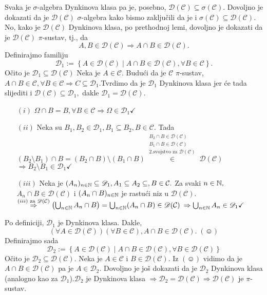 \documentclass{article}
\begin{document}
Svaka je \(\sigma\)-algebra Dynkinova klasa pa je, posebno, \(\mathscr D(\mathcal C)\subseteq\sigma(\mathcal C).\) Dovoljno je dokazati da je \(\mathscr D(\mathcal C)\) \(\sigma\)-algebra kako bismo zaključili da je i \(\sigma(\mathcal C)\subseteq\mathscr D(\mathcal C).\) No, kako je \(\mathscr D(\mathcal C)\) Dynkinova klasa, po prethodnoj lemi, dovoljno je dokazati da je \(\mathscr D(\mathcal C)\) \(\pi\)-sustav, tj., da \[A,B\in\mathscr D(\mathcal C)\Rightarrow A\cap B\in\mathscr D(\mathcal C).\] Definirajmo familiju \[\mathscr D_1:=\left\{A\in\mathscr D(\mathcal C)\mid A\cap B\in\mathscr D(\mathcal C),\forall B\in\mathcal C\right\}.\] Očito je \(\mathscr D_1\subseteq\mathscr D(\mathcal C)\) Neka je \(A\in\mathcal C.\) Budući da je \(\mathcal C\) \(\pi\)-sustav, \(A\cap B\in\mathcal C,\forall B\in\mathcal C\Rightarrow C\subseteq\mathscr D_1.\)\newline Tvrdimo da je \(\mathscr D_1\) Dynkinova klasa jer će tada slijediti i \(\mathscr D(\mathcal C)\subseteq\mathscr D_1,\) dakle \(\mathscr D_1=\mathscr D(\mathcal C).\) 
\begin{enumerate}
    \item[\((i)\)] \(\Omega\cap B=B,\forall B\in\mathcal C\Rightarrow\Omega\in\mathscr D_1\checkmark\)
    \item[\((ii)\)] Neka su \(B_1,B_2\in\mathscr D_1, B_1\subseteq B_2, B\in\mathcal C.\) Tada \((B_2\setminus B_1)\cap B=(B_2\cap B)\setminus(B_1\cap B)\overset{\substack{B_2\cap B\in\mathscr D(\mathcal C)\\ B_1\cap B\in\mathscr D(\mathcal C)\\2.\text{svojstvo za }\mathscr D(\mathcal C)}}{\in}\mathscr D(\mathcal C)\)\newline \(\Rightarrow B_2\setminus B_1\in\mathscr D_1\checkmark\) 
    \item[\((iii)\)] Neka je \((A_n)_{n\in\Bbb N}\subseteq\mathscr D_1, A_1\subseteq A_2\subseteq, B\in\mathcal C.\) Za svaki \(n\in\Bbb N,\) \(A_n\cap B\in\mathscr D(\mathcal C)\) i \((A_n\cap B)_{n\in\Bbb N}\) je rastući niz u \(\mathscr D(\mathcal C).\) \(\overset{(iii)\text{ za }\mathscr D(\mathcal C)}{\Rightarrow}\left(\bigcup_{n\in\Bbb N}A_n\cap B\right)=\bigcup_{n\in\Bbb N}(A_n\cap B)\in\mathscr D(\mathcal C)\) \(\Rightarrow\bigcup_{n\in\Bbb N}A_n\in\mathscr D_1\checkmark\) 
\end{enumerate}
Po definiciji, \(\mathscr D_1\) je Dynkinova klasa. Dakle, \[(\forall A\in\mathscr D(\mathcal C))(\forall B\in\mathcal C), A\cap B\in\mathscr D(\mathcal C).\;(\smiley)\] Definirajmo sada \[\mathscr D_2:=\left\{A\in\mathscr D(\mathcal C)\mid A\cap B\in\mathscr D(\mathcal C),\forall B\in\mathscr D(\mathcal C)\right\}\] Očito je \(\mathscr D_2\subseteq\mathscr D(\mathcal C).\)  Neka je \(A\in\mathcal C\) i \(B\in\mathscr D(\mathcal C).\) Iz \((\smiley)\) vidimo da je \(A\cap B\in\mathscr D(\mathcal C)\) pa je \(A\in\mathscr D_2.\) Dovoljno je još dokazati da je \(\mathscr D_2\) Dynkinova klasa (analogno kao za \(\mathscr D_1\)).\newline \(\mathscr D_2\) je Dynkinova klasa \(\Rightarrow\mathscr D_2=\mathscr D(\mathcal C)\Rightarrow\mathscr D(\mathcal C)\) je \(\pi\)-sustav.
\end{document}
